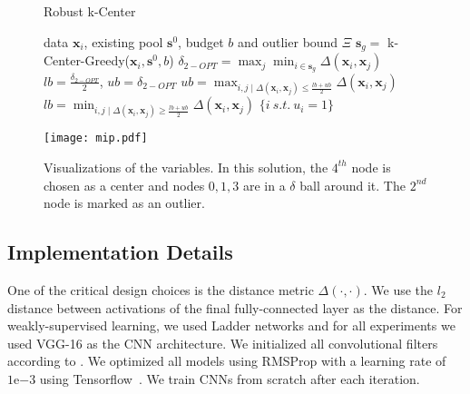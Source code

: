 \documentclass{article} \usepackage{iclr2018_conference,times}
\begin{document}
\begin{figure*}[h]
    \begin{minipage}[t]{0.5\textwidth}
    \vspace{-3mm} 
    \begin{algorithm}[H]
        \caption{Robust k-Center} 
        \label{alg:bin} 
        \begin{algorithmic} 
         data $\mathbf{x}_i$,
            existing pool $\mathbf{s}^0$, budget $b$ and outlier bound $\Xi$ 
          $\mathbf{s}_g
            =$ k-Center-Greedy($\mathbf{x}_i, \mathbf{s}^0, b$) 
            \STATE $\delta_{2-OPT} = \max_j \min_{i \in
            \mathbf{s}_g} \Delta(\mathbf{x}_i,\mathbf{x}_j)$ 
            \STATE $lb=\frac{\delta_{2-OPT}}{2}$, $ub=\delta_{2-OPT}$
            \REPEAT {} 
            \STATE $ub=\max_{i,j \mid
            \Delta(\mathbf{x}_i,\mathbf{x}_j) \leq \frac{lb+ub}{2}}  \Delta(\mathbf{x}_i,\mathbf{x}_j) $ 
            \ELSE 
            \STATE
        $lb=\min_{i,j \mid   \Delta(\mathbf{x}_i,\mathbf{x}_j) \geq \frac{lb+ub}{2}}  \Delta(\mathbf{x}_i,\mathbf{x}_j)
        $ 
        \ENDIF 
         $\{i\ s.t.\ u_i=1\}$ 
\end{algorithmic} 
\end{algorithm}
\end{minipage} \quad
\begin{minipage}[t]{0.45\textwidth}
\vspace{-1mm}
\texttt{[image: mip.pdf]}
\vspace{-5mm}
\caption{Visualizations of the variables. In this solution, the $4^{th}$ node is chosen as a center and nodes $0,1,3$ are in a $\delta$ ball around it. The $2^{nd}$ node is marked as an outlier.} \label{mip}  
\end{minipage}
\end{figure*}


\subsection{Implementation Details} \label{sec:imp} One of the critical design choices is the distance metric
$\Delta(\cdot,\cdot)$. We use the $l_2$ distance between activations of the final fully-connected layer as the distance.
For weakly-supervised learning, we used Ladder networks \citep{ladder} and for all experiments we used VGG-16 \citep{vgg}
as the CNN architecture. We initialized all convolutional filters according to \citet{he_et_al}. We optimized all models using RMSProp with a learning rate of $1\mathrm{e}{-3}$ using
Tensorflow~\citep{tensorflow}. We train CNNs from scratch after each iteration. 
\end{document}
